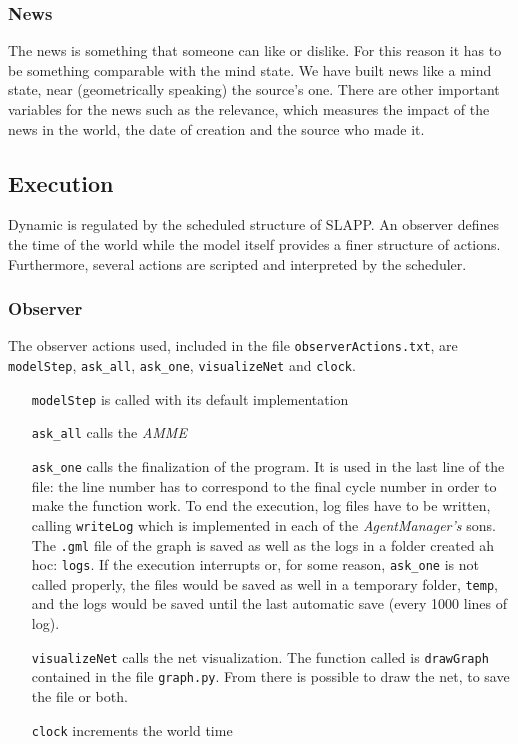 \subsubsection{News}
The news is something that someone can like or dislike. For this reason
it has to be something comparable with the mind state.
We have built news like a mind state, near (geometrically speaking)
the source's one. There are other important variables for the news such as
the relevance, which measures the impact of the news in the world, the
date of creation and the source who made it.

\subsection{Execution}
Dynamic is regulated by the scheduled structure of SLAPP. An observer defines
the time of the world while the model itself provides a finer structure of
actions. Furthermore, several actions are scripted and interpreted by
the scheduler.

\subsubsection{Observer}
The observer actions used, included in the file \texttt{observerActions.txt},
are \texttt{modelStep}, \texttt{ask\_all}, \texttt{ask\_one},
\texttt{visualizeNet} and \texttt{clock}.
\begin{itemize}
\item [\texttt{modelStep}] is called with its default implementation
\item [\texttt{ask\_all}] calls the \textit{AMME}
\item [\texttt{ask\_one}] calls the finalization of the program. It
  is used in the last line of the file: the line number has to correspond
  to the final cycle number in order to make the function work.
  To end the execution, log files have to be written, calling
  \texttt{writeLog} which is implemented in each of the \textit{AgentManager's}
  sons. The \texttt{.gml} file of the graph is saved as well as the logs
  in a folder created ah hoc: \texttt{logs}.
  If the execution interrupts or, for some reason, \texttt{ask\_one} is not
  called properly, the files would be saved as well in a temporary folder,
  \texttt{temp}, and the logs would be saved until the last
  automatic save (every 1000 lines of log).
\item [\texttt{visualizeNet}] calls the net visualization. The function called
  is \texttt{drawGraph} contained in the file \texttt{graph.py}.
  From there is possible to draw the net, to save the file or both.
\item [\texttt{clock}] increments the world time 
\end{itemize}

